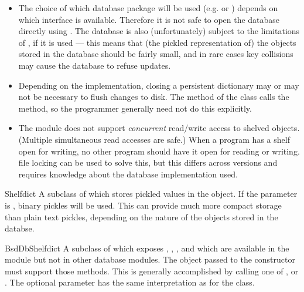 \begin{itemize}

\item
The choice of which database package will be used
(e.g.  or ) depends on which interface
is available.  Therefore it is not safe to open the database directly
using .  The database is also (unfortunately) subject
to the limitations of , if it is used --- this means
that (the pickled representation of) the objects stored in the
database should be fairly small, and in rare cases key collisions may
cause the database to refuse updates.

\item
Depending on the implementation, closing a persistent dictionary may
or may not be necessary to flush changes to disk.  The 
method of the  class calls the  method, so the
programmer generally need not do this explicitly.

\item
The  module does not support \emph{concurrent} read/write
access to shelved objects.  (Multiple simultaneous read accesses are
safe.)  When a program has a shelf open for writing, no other program
should have it open for reading or writing.  \UNIX{} file locking can
be used to solve this, but this differs across \UNIX{} versions and
requires knowledge about the database implementation used.

\end{itemize}

\begin{classdesc}{Shelf}{dict}
A subclass of  which stores pickled values in the
 object.  If the  parameter is , binary
pickles will be used.  This can provide much more compact storage than plain
text pickles, depending on the nature of the objects stored in the databse.
\end{classdesc}

\begin{classdesc}{BsdDbShelf}{dict}
A subclass of  which exposes , ,
{},  and  which are
available in the  module but not in other database modules.
The  object passed to the constructor must support those methods.
This is generally accomplished by calling one of ,
 or .  The optional
 parameter has the same interpretation as for the 
class. 
\end{classdesc}

